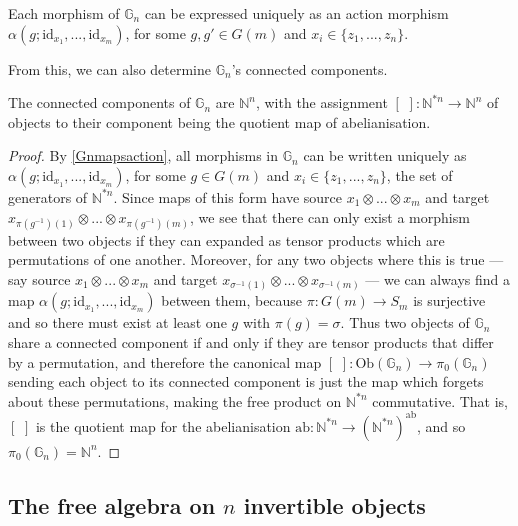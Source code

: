 \begin{lem} \label{Gnmapsaction} Each morphism of $\mathbb{G}_n$ can be expressed uniquely as an action morphism $\alpha(g; \mathrm{id}_{x_1}, ..., \mathrm{id}_{x_m})$, for some $g, g' \in G(m)$ and $x_i \in \{z_1, ..., z_n \}$. \end{lem}

From this, we can also determine $\mathbb{G}_n$'s connected components. 

\begin{prop}\label{Gnconcomp} The connected components of $\mathbb{G}_n$ are $\mathbb{N}^n$, with the assignment $[ \,\, ] : \mathbb{N}^{*n} \to \mathbb{N}^n$ of objects to their component being the quotient map of abelianisation.
\end{prop}
\begin{proof}
By \cref{Gnmapsaction}, all morphisms in $\mathbb{G}_n$ can be written uniquely as $\alpha(g; \mathrm{id}_{x_1}, ..., \mathrm{id}_{x_m})$, for some $g \in G(m)$ and $x_i \in \{z_1, ..., z_n \}$, the set of generators of $\mathbb{N}^{*n}$. Since maps of this form have source $x_1 \otimes ... \otimes x_m$ and target $x_{\pi(g^{-1})(1)} \otimes ... \otimes x_{\pi(g^{-1})(m)}$, we see that there can only exist a morphism between two objects if they can expanded as tensor products which are permutations of one another. Moreover, for any two objects where this is true --- say source $x_1 \otimes ... \otimes x_m$ and target $x_{\sigma^{-1}(1)} \otimes ... \otimes x_{\sigma^{-1}(m)}$ --- we can always find a map $\alpha(g; \mathrm{id}_{x_1}, ..., \mathrm{id}_{x_m})$ between them, because $\pi: G(m) \to S_m$ is surjective and so there must exist at least one $g$ with $\pi(g) = \sigma$. Thus two objects of $\mathbb{G}_n$ share a connected component if and only if they are tensor products that differ by a permutation, and therefore the canonical map $[ \,\, ] : \mathrm{Ob}(\mathbb{G}_n) \to \pi_0(\mathbb{G}_n)$ sending each object to its connected component is just the map which forgets about these permutations, making the free product on $\mathbb{N}^{*n}$ commutative. That is, $[ \,\, ]$ is the quotient map for the abelianisation $\mathrm{ab} : \mathbb{N}^{*n} \to (\mathbb{N}^{*n})^{\mathrm{ab}}$, and so $\pi_0(\mathbb{G}_n) = \mathbb{N}^n$.
\end{proof}

\subsection{The free algebra on $n$ invertible objects}

